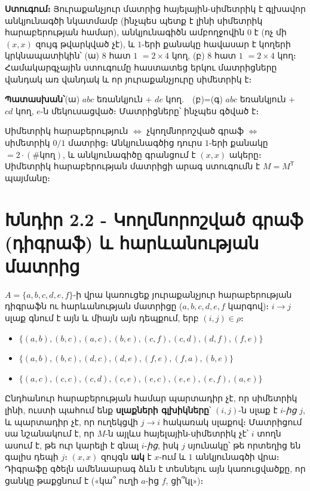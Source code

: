 \documentclass[11pt,a4paper]{article}
\newcommand{\answer}[1]{\begin{answerbox}\centering\textbf{Պատասխան՝}\quad #1\end{answerbox}}
\begin{document}
\textbf{Ստուգում։} Յուրաքանչյուր մատրից հայելային-սիմետրիկ է գլխավոր անկյունագծի նկատմամբ (ինչպես
պետք է լինի սիմետրիկ հարաբերության համար), անկյունագիծն ամբողջովին $0$ է (ոչ մի $(x,x)$ զույգ
թվարկված չէ), և $1$-երի քանակը հավասար է կողերի կրկնապատիկին՝ (ա) $8$ հատ $1$ $=2\times4$ կող,
(բ) $8$ հատ $1$ $=2\times4$ կող։ Համակարգչային ստուգումը հաստատեց երկու մատրիցները վանդակ առ վանդակ և որ յուրաքանչյուրը
սիմետրիկ է։ \checkmark

\answer{(ա) $abc$ եռանկյուն $+$ $de$ կող.\ \ (բ)=(գ) $abc$ եռանկյուն $+$ $cd$ կող, $e$-ն մեկուսացված։
Մատրիցները՝ ինչպես գծված է։}

\begin{methodbox}
Սիմետրիկ հարաբերություն $\Leftrightarrow$ չկողմնորոշված գրաֆ
$\Leftrightarrow$ սիմետրիկ $0/1$ մատրից։ Անկյունագծից դուրս $1$-երի քանակը $=2\cdot(\#\text{կող})$, և անկյունագիծը
գրանցում է $(x,x)$ ակերը։ Սիմետրիկ հարաբերության մատրիցի արագ ստուգումն է $M=M^{\mathsf T}$ պայմանը։
\end{methodbox}

\section*{Խնդիր 2.2 - Կողմնորոշված գրաֆ (դիգրաֆ) և հարևանության մատրից}

\begin{problembox}[2.2]
$A=\{a,b,c,d,e,f\}$-ի վրա կառուցեք յուրաքանչյուր հարաբերության դիգրաֆն ու հարևանության մատրիցը
($a,b,c,d,e,f$ կարգով)։ $i\to j$ սլաք գնում է այն և միայն այն դեպքում, երբ $(i,j)\in\rho$։
\begin{itemize}[leftmargin=1.6em,nosep]
\item[ա)] $\{(a,b),(b,c),(a,c),(b,e),(c,f),(c,d),(d,f),(f,e)\}$
\item[բ)] $\{(a,b),(b,c),(d,c),(d,e),(f,e),(f,a),(b,e)\}$
\item[գ)] $\{(a,c),(c,c),(c,d),(c,e),(e,c),(e,e),(e,f),(a,e)\}$
\end{itemize}
\end{problembox}

\begin{ideabox}
Ընդհանուր հարաբերության համար պարտադիր չէ, որ սիմետրիկ լինի, ուստի պահում ենք \textbf{սլաքների
գլխիկները}՝ $(i,j)$-ն սլաք է $i$-\emph{ից} $j$, և պարտադիր չէ, որ ուղեկցվի $j\to i$ հակառակ սլաքով։ Մատրիցում սա նշանակում
է, որ $M$-ն այլևս հայելային-սիմետրիկ չէ՝ $i$ տողն ասում է, թե ուր կարելի է գնալ $i$-\emph{ից}, իսկ
$j$ սյունակը՝ թե որտեղից են գալիս դեպի $j$։ $(x,x)$ զույգն \textbf{ակ} է $x$-ում և
$1$ անկյունագծի վրա։ Դիգրաֆը գծելն ամենաարագ ձևն է տեսնելու այն կառուցվածքը, որ ցանկը թաքցնում է
(«կա՞ ուղի $a$-ից $f$, ցի՞կլ»)։
\end{ideabox}
\end{document}
